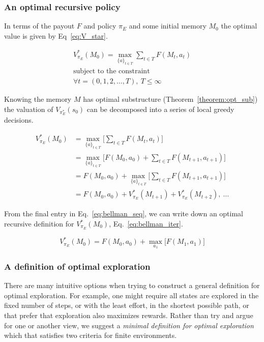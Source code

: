 \documentclass[9pt,twocolumn,twoside]{pnas-new}
\begin{document}
\subsubsection*{An optimal recursive policy}
In terms of the payout $F$ and policy $\pi_E$ and some initial memory $M_0$ the optimal value is given by Eq~\ref{eq:V_star}.

\begin{equation} \label{eq:V_star}
    \begin{split}
        V^*_{\pi_E}(M_0) = \max_{\{a\}_{t \in T}} \sum_{t \in T} F(M_t, a_t)\\
        \text{subject to the constraint}\\
        \forall t = (0,1,2,\ldots, T),\ T \leq \infty
    \end{split}
\end{equation}

Knowing the memory $M$ has optimal substructure (Theorem~\ref{theorem:opt_sub}) the valuation of $V_{\pi_E^*}(s_0)$ can be decomposed into a series of local greedy decisions.

\begin{equation} \label{eq:bellman_seq}
    \begin{split}
        V^*_{\pi_E}(M_0) &= \max_{\{a\}_{t \in T}} \Big [\sum_{t \in T} F(M_t, a_t)\Big ]\\
                         &= \max_{\{a\}_{t \in T}} \Big [F(M_0, a_0) + \sum_{t \in T}F(M_{t+1}, a_{t+1})\Big ]\\
                         &= F(M_0, a_0) + \max_{\{a\}_{t \in T}} \Big [\sum_{t \in T} F(M_{t+1}, a_{t+1}) \Big ]\\
                         &= F(M_0, a_0) + V^*_{\pi_E}(M_{t+1}) + V^*_{\pi_E}(M_{t+2}),\ \ldots
    \end{split}
\end{equation}

From the final entry in Eq.~\ref{eq:bellman_seq}, we can write down an optimal recursive definition for $V^*_{\pi_E}(M_0)$, Eq.~\ref{eq:bellman_iter}.

\begin{equation} \label{eq:bellman_iter}
    V^*_{\pi_E}(M_0) = F(M_0, a_0) + \max_{a_1} \Big [F(M_1, a_1) \Big ]
\end{equation}
    

\subsubsection*{A definition of optimal exploration}
There are many intuitive options when trying to construct a general definition for optimal exploration. For example, one might require all states are explored in the fixed number of steps, or with the least effort, in the shortest possible path, or that prefer that exploration also maximizes rewards. Rather than try and argue for one or another view, we suggest a \textit{minimal definition for optimal exploration} which that satisfies two criteria for finite environments. 
\end{document}
